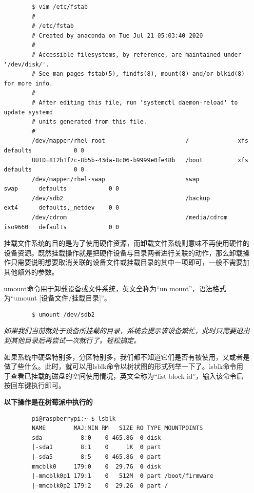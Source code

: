 \documentclass[UTF8]{article}
\begin{document}
	\begin{lstlisting}
		$ vim /etc/fstab
		#
		# /etc/fstab
		# Created by anaconda on Tue Jul 21 05:03:40 2020
		#
		# Accessible filesystems, by reference, are maintained under '/dev/disk/'.
		# See man pages fstab(5), findfs(8), mount(8) and/or blkid(8) for more info.
		#
		# After editing this file, run 'systemctl daemon-reload' to update systemd
		# units generated from this file.
		#
		/dev/mapper/rhel-root                       /              xfs       defaults            0 0
		UUID=812b1f7c-8b5b-43da-8c06-b9999e0fe48b   /boot          xfs       defaults            0 0
		/dev/mapper/rhel-swap                       swap           swap      defaults            0 0
		/dev/sdb2                                   /backup        ext4      defaults,_netdev    0 0
		/dev/cdrom                                  /media/cdrom   iso9660   defaults            0 0
	\end{lstlisting}
	
	挂载文件系统的目的是为了使用硬件资源，而卸载文件系统则意味不再使用硬件的设备资源。既然挂载操作就是把硬件设备与目录两者进行关联的动作，那么卸载操作只需要说明想要取消关联的设备文件或挂载目录的其中一项即可，一般不需要加其他额外的参数。
	
	umount命令用于卸载设备或文件系统，英文全称为“un mount”，语法格式为“umount [设备文件/挂载目录]”。
	
	\begin{lstlisting}
		$ umount /dev/sdb2
	\end{lstlisting}
	
	\emph{如果我们当前就处于设备所挂载的目录，系统会提示该设备繁忙，此时只需要退出到其他目录后再尝试一次就行了。轻松搞定。}
	
	如果系统中硬盘特别多，分区特别多，我们都不知道它们是否有被使用，又或者是做了些什么。此时，就可以用lsblk命令以树状图的形式列举一下了。lsblk命令用于查看已挂载的磁盘的空间使用情况，英文全称为“list block id”，输入该命令后按回车键执行即可。
	
	\textbf{以下操作是在树莓派中执行的}
	
	\begin{lstlisting}
		pi@raspberrypi:~ $ lsblk
		NAME        MAJ:MIN RM   SIZE RO TYPE MOUNTPOINTS
		sda           8:0    0 465.8G  0 disk
		|-sda1        8:1    0     1K  0 part
		|-sda5        8:5    0 465.8G  0 part
		mmcblk0     179:0    0  29.7G  0 disk
		|-mmcblk0p1 179:1    0   512M  0 part /boot/firmware
		|-mmcblk0p2 179:2    0  29.2G  0 part /
	\end{lstlisting}
	
\end{document}
